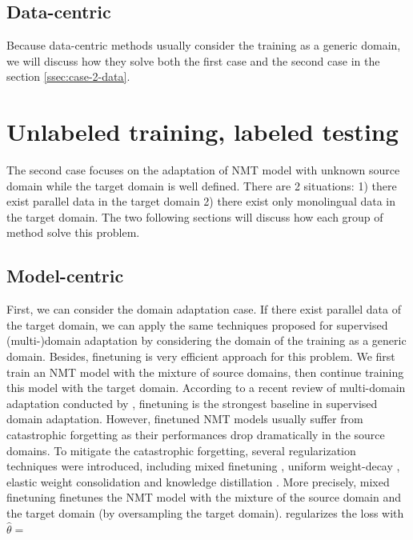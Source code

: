\subsection{Data-centric}
Because data-centric methods usually consider the training as a generic domain, we will discuss how they solve both the first case and the second case in the section \ref{ssec:case-2-data}.

\section{Unlabeled training, labeled testing}
\label{sec:case2}
The second case focuses on the adaptation of NMT model with unknown source domain while the target domain is well defined. There are 2 situations: 1) there exist parallel data in the target domain 2) there exist only monolingual data in the target domain. The two following sections will discuss how each group of method solve this problem.
\subsection{Model-centric}

First, we can consider the domain adaptation case. If there exist parallel data of the target domain, we can apply the same techniques proposed for supervised (multi-)domain adaptation by considering the domain of the training as a generic domain. Besides, finetuning is very efficient approach for this problem\citep{Luong15stanford,Miceli17regularization,Servan16Domain,Freitag16fast}. We first train an NMT model with the mixture of source domains, then continue training this model with the target domain. According to a recent review of multi-domain adaptation conducted by \citet{Pham20Priming}, finetuning is the strongest baseline in supervised domain adaptation. However, finetuned NMT models usually suffer from catastrophic forgetting \citep{Michael89catastrophic} as their performances drop dramatically in the source domains. To mitigate the catastrophic forgetting, several regularization techniques were introduced, including mixed finetuning \citep{Chu17empirical}, uniform weight-decay \citep{Miceli17regularization}, elastic weight consolidation \citep{Brian19overcoming, Kirk16overcoming,Saunders19domain} and knowledge distillation \citep{Dakwle17fine}. More precisely, mixed finetuning finetunes the NMT model with the mixture of the source domain and the target domain (by oversampling the target domain). \citep{Miceli17regularization} regularizes the loss with $\hat{\theta} = $

